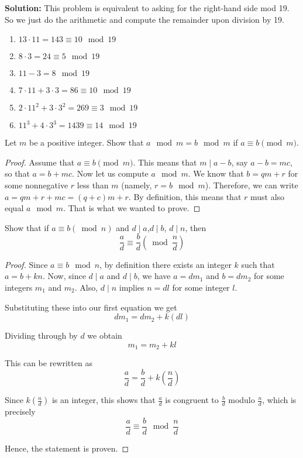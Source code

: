     \textbf{Solution:} This problem is equivalent to asking for the right-hand side mod 19. So we just do the arithmetic and compute the remainder upon division by 19.
    \begin{enumerate}
        \item \( 13 \cdot 11 = 143 \equiv 10 \mod{19} \)
        \item \( 8 \cdot 3 = 24 \equiv 5 \mod{19} \)
        \item \( 11 - 3 = 8 \mod{19} \)
        \item \( 7 \cdot 11 + 3 \cdot 3 = 86 \equiv 10 \mod{19} \)
        \item \( 2 \cdot 11^2 + 3 \cdot 3^2 = 269 \equiv 3 \mod{19} \)
        \item \( 11^3 + 4 \cdot 3^3 = 1439 \equiv 14 \mod{19} \)
    \end{enumerate}

    \begin{exercise}
        Let \( m \) be a positive integer. Show that \( a \mod m = b \mod m \) if \( a \equiv b \pmod{m} \).
    \end{exercise}
    \begin{proof}
        Assume that \( a \equiv b \pmod{m} \). This means that \( m \mid a - b \), say \( a - b = mc \), so that \( a = b + mc \). Now let us compute \( a \mod m \). We know that \( b = qm + r \) for some nonnegative \( r \) less than \( m \) (namely, \( r = b \mod m \)). Therefore, we can write \( a = qm + r + mc = (q + c)m + r \). By definition, this means that \( r \) must also equal \( a \mod m \). That is what we wanted to prove.
    \end{proof}

    \begin{exercise}
        Show that if $a \equiv b (\bmod n)$ and $d\mid a$,$d\mid b$, $d\mid n$, then
        $$\frac{a}{d}\equiv \frac{b}{d} (\bmod \frac{n}{d})$$
    \end{exercise}
    \begin{proof}
        Since \( a \equiv b \mod n \), by definition there exists an integer \( k \) such that \( a = b + kn \). Now, since \( d \mid a \) and \( d \mid b \), we have \( a = dm_1 \) and \( b = dm_2 \) for some integers \( m_1 \) and \( m_2 \). Also, \( d \mid n \) implies \( n = dl \) for some integer \( l \).
        
        Substituting these into our first equation we get
        \[
        dm_1 = dm_2 + k(dl)
        \]
        
        Dividing through by \( d \) we obtain
        \[
        m_1 = m_2 + kl
        \]
        
        This can be rewritten as
        \[
        \frac{a}{d} = \frac{b}{d} + k \left(\frac{n}{d}\right)
        \]
        
        Since \( k \left(\frac{n}{d}\right) \) is an integer, this shows that \( \frac{a}{d} \) is congruent to \( \frac{b}{d} \) modulo \( \frac{n}{d} \), which is precisely
        \[
        \frac{a}{d} \equiv \frac{b}{d} \mod \frac{n}{d}
        \]
        
        Hence, the statement is proven.
    \end{proof}

